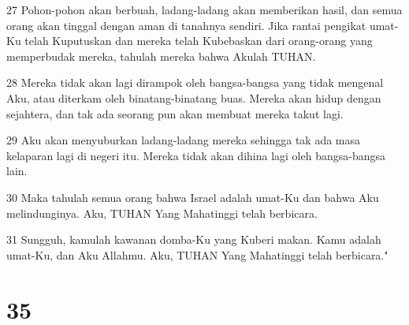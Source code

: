 \par 27 Pohon-pohon akan berbuah, ladang-ladang akan memberikan hasil, dan semua orang akan tinggal dengan aman di tanahnya sendiri. Jika rantai pengikat umat-Ku telah Kuputuskan dan mereka telah Kubebaskan dari orang-orang yang memperbudak mereka, tahulah mereka bahwa Akulah TUHAN.
\par 28 Mereka tidak akan lagi dirampok oleh bangsa-bangsa yang tidak mengenal Aku, atau diterkam oleh binatang-binatang buas. Mereka akan hidup dengan sejahtera, dan tak ada seorang pun akan membuat mereka takut lagi.
\par 29 Aku akan menyuburkan ladang-ladang mereka sehingga tak ada masa kelaparan lagi di negeri itu. Mereka tidak akan dihina lagi oleh bangsa-bangsa lain.
\par 30 Maka tahulah semua orang bahwa Israel adalah umat-Ku dan bahwa Aku melindunginya. Aku, TUHAN Yang Mahatinggi telah berbicara.
\par 31 Sungguh, kamulah kawanan domba-Ku yang Kuberi makan. Kamu adalah umat-Ku, dan Aku Allahmu. Aku, TUHAN Yang Mahatinggi telah berbicara."

\chapter{35}

